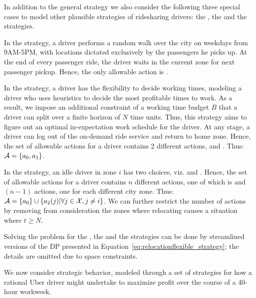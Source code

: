 { In addition to the general {\relocationflexible} strategy we also
consider the following three special cases to model other plausible strategies of ridesharing drivers: 
the {\naive}, the {\relocation} and the {\flexible} strategies.

In the{\naive} strategy, a driver performs a random walk over the city on weekdays from 9AM-5PM, with locations dictated exclusively by the passengers he picks up. At the end of every passenger ride, the driver waits in the current zone for next passenger pickup. 
Hence, the only allowable action is {\getpassenger}.


In the {\flexible} strategy, a driver has the flexibility to decide working times, modeling a driver who uses heuristics to decide the most profitable times to work.   As a result, we impose an additional constraint of a working time budget $B$ that a driver can split over a finite horizon of $N$ time units. Thus, this strategy aims to figure out an optimal 
in-expectation work schedule for the driver.  
At any stage, a driver can log out of the on-demand ride service and return to home zone. Hence, the set of allowable actions for a driver contains 2 different actions, {\getpassenger} and {\gohome}.  Thus: $
\mathcal{A} = \{a_0, a_1\}$.

In the {\relocation} strategy, an idle driver in zone $i$ has two choices, viz. {\getpassenger} and {\relocate}. Hence, the set of allowable actions for a driver contains $n$ different actions, one of which is {\getpassenger} and $(n-1)$ {\relocate} actions, one for each different city zone.  Thus: $
\mathcal{A} =  \{a_0\} \cup \{a_2(j) | \forall j \in \mathcal{X}, j \neq i \}
$.
We can further restrict the number of {\relocate} actions by removing from consideration the zones where relocating causes a situation where $t \geq N$.

Solving the {\originalproblem} problem for the {\naive}, the {\relocation} and the
{\flexible} strategies can be done by streamlined versions of the DP presented in 
Equation~\eqref{eq:relocationflexible_strategy}; the details
are omitted due to space constraints.


\iffalse
We now consider strategic behavior, modeled through a set of strategies for how 
a rational Uber driver might undertake to maximize profit over the course of a 
40-hour workweek.  

}
